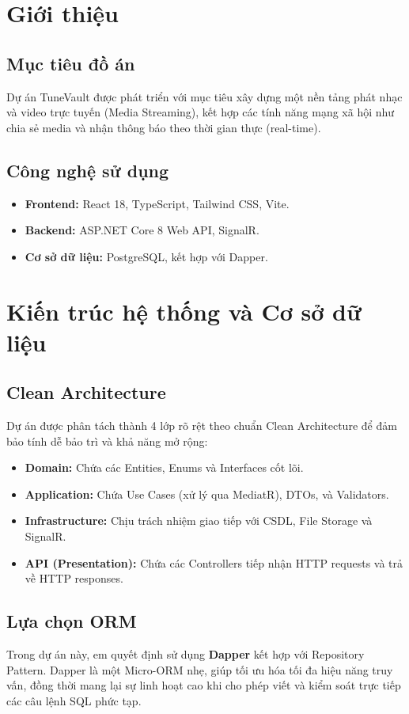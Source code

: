 \documentclass[a4paper,12pt]{article}
\begin{document}
\newpage
\tableofcontents
\newpage

\section{Giới thiệu}
\subsection{Mục tiêu đồ án}
Dự án TuneVault được phát triển với mục tiêu xây dựng một nền tảng phát nhạc và video trực tuyến (Media Streaming), kết hợp các tính năng mạng xã hội như chia sẻ media và nhận thông báo theo thời gian thực (real-time).

\subsection{Công nghệ sử dụng}
\begin{itemize}
    \item \textbf{Frontend:} React 18, TypeScript, Tailwind CSS, Vite.
    \item \textbf{Backend:} ASP.NET Core 8 Web API, SignalR.
    \item \textbf{Cơ sở dữ liệu:} PostgreSQL, kết hợp với Dapper.
\end{itemize}

\section{Kiến trúc hệ thống và Cơ sở dữ liệu}
\subsection{Clean Architecture}
Dự án được phân tách thành 4 lớp rõ rệt theo chuẩn Clean Architecture để đảm bảo tính dễ bảo trì và khả năng mở rộng:
\begin{itemize}
    \item \textbf{Domain:} Chứa các Entities, Enums và Interfaces cốt lõi.
    \item \textbf{Application:} Chứa Use Cases (xử lý qua MediatR), DTOs, và Validators.
    \item \textbf{Infrastructure:} Chịu trách nhiệm giao tiếp với CSDL, File Storage và SignalR.
    \item \textbf{API (Presentation):} Chứa các Controllers tiếp nhận HTTP requests và trả về HTTP responses.
\end{itemize}

\subsection{Lựa chọn ORM}
Trong dự án này, em quyết định sử dụng \textbf{Dapper} kết hợp với Repository Pattern. Dapper là một Micro-ORM nhẹ, giúp tối ưu hóa tối đa hiệu năng truy vấn, đồng thời mang lại sự linh hoạt cao khi cho phép viết và kiểm soát trực tiếp các câu lệnh SQL phức tạp.
\end{document}
